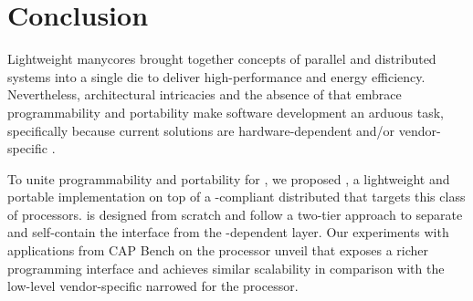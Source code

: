 \section{Conclusion}
\label{sec:conclusions}

	Lightweight manycores brought together concepts of parallel and
	distributed systems into a single die to deliver high-performance and
	energy efficiency.  Nevertheless, architectural intricacies and the
	absence of \apis that embrace programmability and portability
	make software development an arduous task, specifically because
	current solutions are hardware-dependent and/or vendor-specific \apis.

	To unite programmability and portability for \lws,
	we proposed \lwmpi, a lightweight and portable \mpi implementation on
	top of a \posix-compliant distributed \os that targets this class of
	processors. \lwmpi is designed from scratch and follow a two-tier
	approach to separate and self-contain the \mpi interface from the
	\os-dependent layer.
	Our experiments with applications from CAP Bench on the \mppa processor
	unveil that \lwmpi exposes a richer programming interface and
	achieves similar scalability in comparison with the low-level vendor-specific 
	\api narrowed for the \mppa processor.
